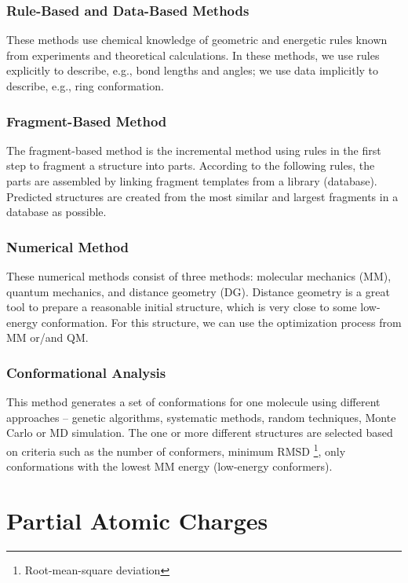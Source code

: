 \subsection{Rule-Based and Data-Based Methods}

These methods use chemical knowledge of geometric and energetic rules known
from experiments and theoretical calculations. In these methods, we use rules
explicitly to describe, e.g., bond lengths and angles; we use data implicitly
to describe, e.g., ring conformation.

\subsection{Fragment-Based Method}

The fragment-based method is the incremental method using rules in the first
step to fragment a structure into parts. According to the following rules,
the parts are assembled by linking fragment templates from a library
(database). Predicted structures are created from the most similar and largest
fragments in a database as possible.

\subsection{Numerical Method}

These numerical methods consist of three methods: molecular mechanics
(MM), quantum mechanics, and distance geometry (DG). Distance geometry is
a great tool to prepare a reasonable initial structure, which is very close
to some low-energy conformation. For this structure, we can use
the optimization process from MM or/and QM.

\subsection{Conformational Analysis}

This method generates a set of conformations for one molecule using
different approaches -- genetic algorithms, systematic methods, random
techniques, Monte Carlo or MD simulation. The one or more different structures
are selected based on criteria such as the number of conformers, minimum
RMSD \footnote{Root-mean-square deviation}, only conformations with the lowest MM energy (low-energy conformers).

\chapter{Partial Atomic Charges}

